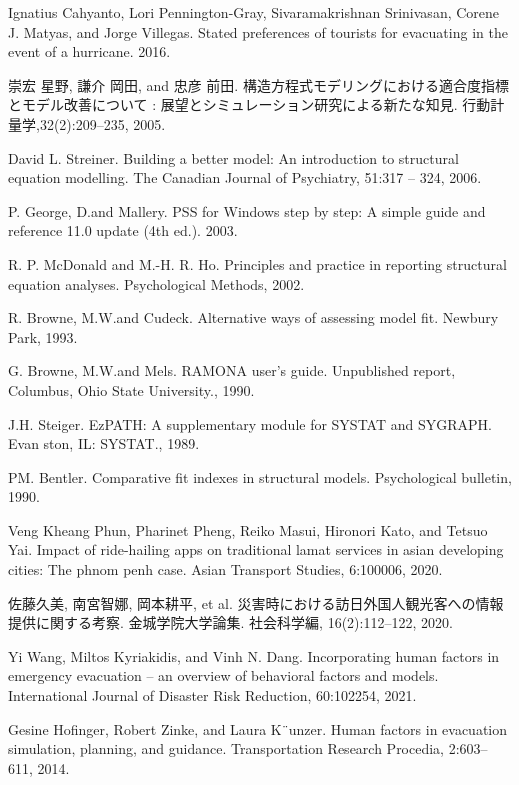 \documentclass[letterpaper,12pt,titlepage,oneside,final,a4j,dvipdfmx]{book}
\begin{document}
\begin{thebibliography}{70}
 Ignatius Cahyanto, Lori Pennington-Gray, Sivaramakrishnan Srinivasan, Corene J.
Matyas, and Jorge Villegas. Stated preferences of tourists for evacuating in the event
of a hurricane. 2016.

 崇宏 星野, 謙介 岡田, and 忠彦 前田. 構造方程式モデリングにおける適合度指標とモデル改善について : 展望とシミュレーション研究による新たな知見. 行動計量学,32(2):209–235, 2005.

 David L. Streiner. Building a better model: An introduction to structural equation modelling. The Canadian Journal of Psychiatry, 51:317 – 324, 2006.


 P. George, D.and Mallery. PSS for Windows step by step: A simple guide and reference 11.0 update (4th ed.). 2003.

 R. P. McDonald and M.-H. R. Ho. Principles and practice in reporting structural equation analyses. Psychological Methods, 2002.

  R. Browne, M.W.and Cudeck. Alternative ways of assessing model fit. Newbury Park, 1993.

  G. Browne, M.W.and Mels. RAMONA user's guide. Unpublished report, Columbus, Ohio State University., 1990.

  J.H. Steiger. EzPATH: A supplementary module for SYSTAT and SYGRAPH. Evan ston, IL: SYSTAT., 1989.

 PM. Bentler. Comparative fit indexes in structural models. Psychological bulletin, 1990.

  Veng Kheang Phun, Pharinet Pheng, Reiko Masui, Hironori Kato, and Tetsuo Yai. Impact of ride-hailing apps on traditional lamat services in asian developing cities: The phnom penh case. Asian Transport Studies, 6:100006, 2020.


 佐藤久美, 南宮智娜, 岡本耕平, et al. 災害時における訪日外国人観光客への情報提供に関する考察. 金城学院大学論集. 社会科学編, 16(2):112–122, 2020.


  Yi Wang, Miltos Kyriakidis, and Vinh N. Dang. Incorporating human factors in emergency evacuation – an overview of behavioral factors and models. International Journal of Disaster Risk Reduction, 60:102254, 2021.

 Gesine Hofinger, Robert Zinke, and Laura K¨unzer. Human factors in evacuation simulation, planning, and guidance. Transportation Research Procedia, 2:603–611, 2014.



\end{thebibliography}
\end{document}
